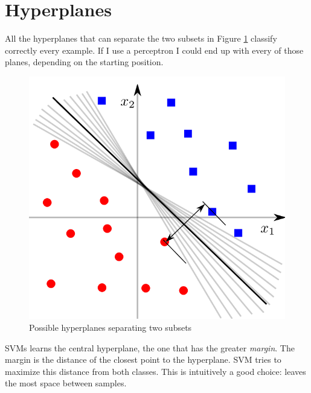 \section{Hyperplanes}
All the hyperplanes that can separate the two subsets in Figure \ref{fig:hyperplanesSVMs}
classify correctly every example. If I use a perceptron I could end up with
every of those planes, depending on the starting position.
\begin{figure}[H]
	\centering
	\includegraphics[scale=0.5]{
        images/13_SupportVectorMachines_hyperplanes.png
    }
	\caption{Possible hyperplanes separating two subsets}
	\label{fig:hyperplanesSVMs}
\end{figure}
SVMs learns the central hyperplane, the one that has the greater \textit{margin}.
The margin is the distance of the closest point to the hyperplane. SVM tries to
maximize this distance from both classes. This is intuitively a good choice:
leaves the most space between samples.


